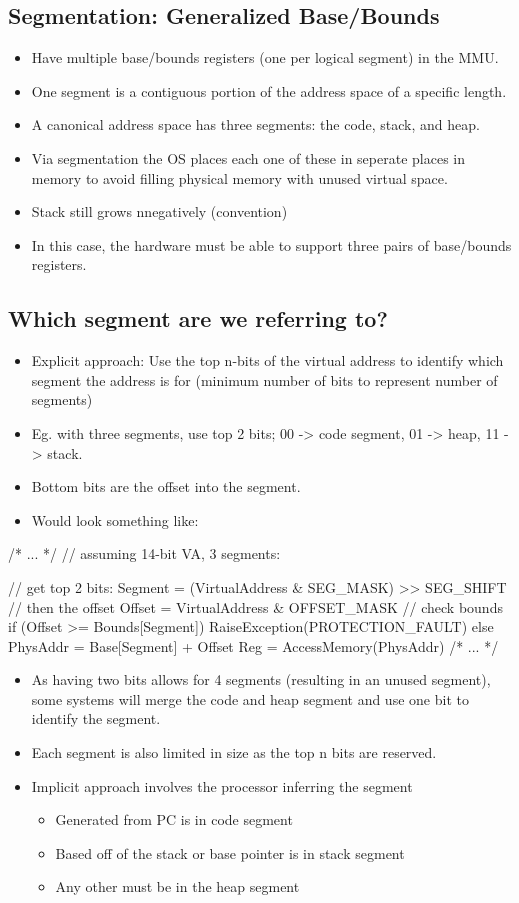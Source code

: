\documentclass[11pt, a4paper]{article}
\theoremstyle{definition}
\theoremstyle{remark}
\begin{document}
\subsection{Segmentation: Generalized Base/Bounds}
\begin{itemize}
  \item Have multiple base/bounds registers (one per logical segment) in the MMU.
  \item One segment is a contiguous portion of the address space of a specific length.
  \item A canonical address space has three segments: the code, stack, and heap.
  \item Via segmentation the OS places each one of these in seperate places in memory to avoid filling physical memory with unused virtual space.
  \item Stack still grows nnegatively (convention)
  \item In this case, the hardware must be able to support three pairs of base/bounds registers.
\end{itemize}
\subsection{Which segment are we referring to?}
\begin{itemize}
  \item Explicit approach: Use the top n-bits of the virtual address to identify which segment the address is for (minimum number of bits to represent number of segments)
  \item Eg. with three segments, use top 2 bits; 00 -> code segment, 01 -> heap, 11 -> stack.
  \item Bottom bits are the offset into the segment. 
  \item Would look something like:
\end{itemize}
\begin{ccode}
/* ... */
// assuming 14-bit VA, 3 segments: 

// get top 2 bits:
Segment = (VirtualAddress & SEG_MASK) >> SEG_SHIFT
// then the offset 
Offset = VirtualAddress & OFFSET_MASK 
// check bounds 
if (Offset >= Bounds[Segment]) RaiseException(PROTECTION_FAULT) 
else { 
  PhysAddr = Base[Segment] + Offset 
  Reg = AccessMemory(PhysAddr)
}
/* ... */
\end{ccode}
\begin{itemize}
  \item As having two bits allows for 4 segments (resulting in an unused segment), some systems will merge the code and heap segment and use one bit to identify the segment.
  \item Each segment is also limited in size as the top n bits are reserved. 
  \item Implicit approach involves the processor inferring the segment
  \begin{itemize}
    \item Generated from PC is in code segment 
    \item Based off of the stack or base pointer is in stack segment 
    \item Any other must be in the heap segment
  \end{itemize}
\end{itemize}
\end{document}
